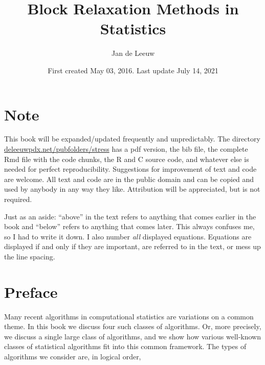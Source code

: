 \documentclass[
  12pt,
]{book}
\title{Block Relaxation Methods in Statistics}
\author{Jan de Leeuw}
\date{First created May 03, 2016. Last update July 14, 2021}
\begin{document}
\maketitle

{
\setcounter{tocdepth}{3}
\tableofcontents
}
\newcommand{\ul}[1]{\underline{#1}}
\newcommand{\ol}[1]{\overline{#1}}
\newcommand{\bb}[1]{\mathbb{#1}}
\newcommand{\mc}[1]{\mathcal{#1}}
\newcommand{\df}{=:}
\newcommand{\am}[1]{\mathop{\text{argmin}}_{#1}}
\newcommand{\ls}[2]{\mathop{\sum\sum}_{#1}^{#2}}
\newcommand{\ijs}{\mathop{\sum\sum}_{1\leq i<j\leq n}}
\newcommand{\jis}{\mathop{\sum\sum}_{1\leq j<i\leq n}}
\newcommand{\sij}{\sum_{i=1}^n\sum_{j=1}^n}

\hypertarget{note}{%
\chapter*{Note}\label{note}}

This book will be expanded/updated frequently and unpredictably.
The directory \href{http://deleeuwpdx.net/pubfolders/stress}{deleeuwpdx.net/pubfolders/stress} has a pdf version, the bib file, the complete Rmd file with the code chunks, the R and C source code, and whatever else is needed for perfect reproducibility. Suggestions for improvement of text and code are welcome. All text and code are in the public domain and can be copied and used by anybody in any way they like. Attribution will be appreciated, but is not required.

Just as an aside: ``above'' in the text refers to anything that comes earlier in the book and ``below'' refers to anything that comes later. This always confuses me, so I had to write it down. I also number \emph{all} displayed equations. Equations are displayed if and only if they are important, are referred to in the text, or mess up the line spacing.

\hypertarget{preface}{%
\chapter*{Preface}\label{preface}}

Many recent algorithms in computational statistics
are variations on a common theme. In this book we discuss four such classes of algorithms. Or, more precisely, we discuss a single large class of algorithms, and we show how various well-known classes of statistical algorithms fit into
this common framework. The types of algorithms we consider are, in logical order,
\end{document}
